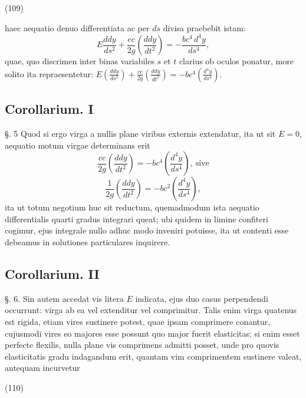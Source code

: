 \documentclass[11pt,a4paper]{article}
\begin{document}
(109)

haec aequatio denuo differentiata ac per $ds$ divisa praebebit istam:
\[
E\frac{ddy}{ds^2} + \frac{cc}{2g}\left(\frac{ddy}{dt^2}\right) = -\frac{bc^4\,d^4y}{ds^4},
\]
quae, quo discrimen inter binas variabiles $s$ et $t$ clarius ob oculos
ponatur, more solito ita repraesentetur:
$E\left(\frac{ddy}{ds^2}\right) + \frac{cc}{2g}\left(\frac{ddy}{dt^2}\right) = -bc^4\left(\frac{d^4y}{ds^4}\right)$.

\subsection{Corollarium. I}

§. 5 Quod si ergo virga a nullis plane viribus externis extendatur, ita ut
sit $E = 0$, aequatio motum virgae determinans erit
\[
\frac{cc}{2g}\left(\frac{ddy}{dt^2}\right) = -bc^4\left(\frac{d^4y}{ds^4}\right), \ \text{sive}
\]
\[
\frac{1}{2g}\left(\frac{ddy}{dt^2}\right) = -bc^2\left(\frac{d^4y}{ds^4}\right),
\]
ita ut totum negotium huc sit reductum, quemadmodum ista aequatio
differentialis quarti gradus integrari queat; ubi quidem in limine
confiteri cogimur, ejus integrale nullo adhuc modo inveniri potuisse, ita ut
contenti esse debeamus in solutiones particulares inquirere.

\subsection{Corollarium. II}

§. 6. Sin autem accedat vis litera $E$ indicata, ejus duo casus perpendendi
occurrunt:  virga ab ea vel extenditur vel comprimitur.
Talis enim virga quatenus est rigida, etiam vires sustinere potest, quae
ipsam comprimere conantur, cujusmodi vires eo majores esse possunt quo major
fuerit elasticitas; si enim esset perfecte flexilis, nulla plane vis
comprimens admitti posset, unde pro quovis elasticitatis gradu indagandum
erit, quantam vim comprimentem sustinere valeat, antequam incurvetur

(110)
\end{document}
